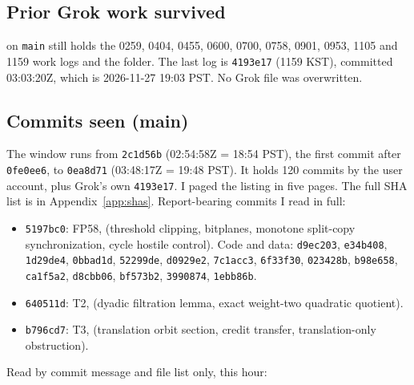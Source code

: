 \documentclass[11pt]{article}
\theoremstyle{definition}
\theoremstyle{remark}
\begin{document}
\subsection{Prior Grok work survived}
 on \texttt{main} still holds the 0259, 0404, 0455, 0600,
0700, 0758, 0901, 0953, 1105 and 1159 work logs and the  folder. The last log is
\texttt{4193e17} (1159 KST), committed 03:03:20Z, which is 2026-11-27 19:03 PST. No Grok file
was overwritten.

\subsection{Commits seen (main)}
The window runs from \texttt{2c1d56b} (02:54:58Z = 18:54 PST), the first commit after
\texttt{0fe0ee6}, to \texttt{0ea8d71} (03:48:17Z = 19:48 PST). It holds 120 commits by the
user account, plus Grok's own \texttt{4193e17}. I paged the listing in five pages. The full
SHA list is in Appendix~\ref{app:shas}. Report-bearing commits I read in full:
\begin{itemize}
\item \texttt{5197bc0}: FP58,
(threshold clipping, bitplanes, monotone split-copy synchronization, cycle hostile control).
Code and data: \texttt{d9ec203}, \texttt{e34b408}, \texttt{1d29de4}, \texttt{0bbad1d},
\texttt{52299de}, \texttt{d0929e2}, \texttt{7c1acc3}, \texttt{6f33f30}, \texttt{023428b},
\texttt{b98e658}, \texttt{ca1f5a2}, \texttt{d8cbb06}, \texttt{bf573b2}, \texttt{3990874},
\texttt{1ebb86b}.
\item \texttt{640511d}: T2,
(dyadic filtration lemma, exact weight-two quadratic quotient).
\item \texttt{b796cd7}: T3,
(translation orbit section, credit transfer, translation-only obstruction).
\end{itemize}
Read by commit message and file list only, this hour:
\end{document}
